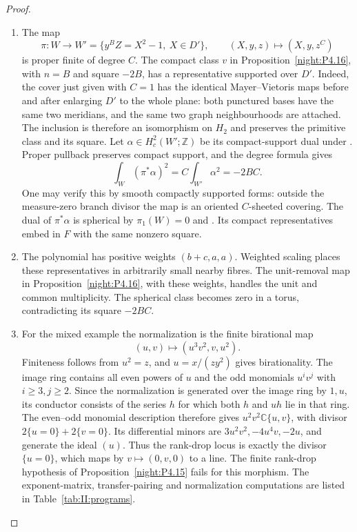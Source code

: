 \begin{proof}
\begin{enumerate}[label={$\langle1\rangle$\arabic*.},leftmargin=*]
\item The map
\[
 \pi:W\longrightarrow W'=\{y^BZ=X^2-1,\ X\in D'\},
 \qquad (X,y,z)\longmapsto(X,y,z^C)
\]
is proper finite of degree $C$. The compact class $v$ in
Proposition~\ref{night:P4.16}, with $n=B$ and square $-2B$,
has a representative supported over $D'$.
Indeed, the cover just given with $C=1$ has the identical
Mayer--Vietoris maps before and after enlarging $D'$ to the
whole plane: both punctured bases have the same two meridians,
and the same two graph neighbourhoods are attached. The
inclusion is therefore an isomorphism on $H_2$ and preserves
the primitive class and its square.
Let $\alpha\in H_c^2(W';\mathbb Z)$ be its compact-support dual
under \cite[Theorem~3.35, p.~245]{Hatcher2002}. Proper pullback
preserves compact support, and the degree formula gives
\[
 \int_W(\pi^*\alpha)^2=C\int_{W'}\alpha^2=-2BC.
\]
One may verify this by smooth compactly supported forms:
outside the measure-zero branch divisor the map is an oriented
$C$-sheeted covering. The dual of $\pi^*\alpha$ is spherical
by $\pi_1(W)=0$ and \cite[Theorem~4.32, pp.~366--367]{Hatcher2002}. Its compact representatives
embed in $F$ with the same nonzero square.

\item The polynomial has positive weights $(b+c,a,a)$. Weighted
scaling places these representatives in arbitrarily small
nearby fibres. The unit-removal map in
Proposition~\ref{night:P4.16}, with these weights, handles
the unit and common multiplicity. The spherical class becomes zero
in a torus, contradicting its square $-2BC$.

\item For the mixed example the normalization is the finite
birational map
\[
 (u,v)\longmapsto(u^3v^2,v,u^2).
\]
Finiteness follows from $u^2=z$, and $u=x/(zy^2)$ gives
birationality. The image ring contains all even powers of $u$
and the odd monomials $u^iv^j$ with $i\geq3,j\geq2$.
Since the normalization is generated over the image ring by $1,u$,
its conductor consists of the series $h$ for which both $h$ and $uh$
lie in that ring. The even--odd monomial description therefore gives
$u^2v^2\mathbb C\{u,v\}$, with divisor
$2\{u=0\}+2\{v=0\}$. Its differential minors are
$3u^2v^2,-4u^4v,-2u$, and generate the ideal $(u)$. Thus the rank-drop locus is exactly
the divisor $\{u=0\}$, which maps by $v\mapsto(0,v,0)$
to a line. The finite rank-drop hypothesis of
Proposition~\ref{night:P4.15} fails for this morphism.
The exponent-matrix, transfer-pairing and normalization computations
are listed in Table~\ref{tab:II:programs}.

\end{enumerate}
\end{proof}